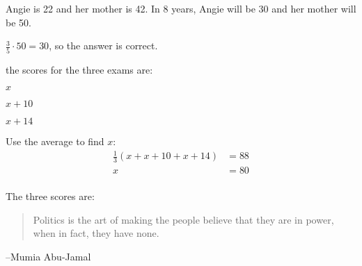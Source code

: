 \documentclass[letterpaper]{exam}
\begin{document}
\begin{description}
      Angie is 22 and her mother is 42.  In 8 years, Angie will be 30 and her
      mother will be 50.  
      
      $\frac{3}{5} \cdot 50 = 30$, so the answer is correct.

      \item[53] 
        the scores for the three exams are:
        \begin{itemize*}
          \item $x$
          \item $x + 10$
          \item $x + 14$
        \end{itemize*}

        Use the average to find $x$:
        \begin{align*}
          \frac{1}{3} ( x + x + 10 + x + 14 ) & = 88 \\
          x                                   & = 80 \\
        \end{align*}

        The three scores are: 
    \end{description}

  \fi

  \ifprintanswers{}
  \else
    \vspace{10 cm}
    \begin{quote}
      \begin{em}
        Politics is the art of making the people believe that they are in
        power, when in fact, they have none.        
      \end{em}
    \end{quote}
    \hspace{1 cm} --Mumia Abu-Jamal
  \fi
\end{document}
